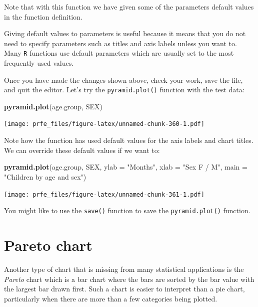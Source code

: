 \documentclass[12pt,]{book}
\newenvironment{Shaded}{\begin{snugshade}}{\end{snugshade}}
\newcommand{\KeywordTok}[1]{\textcolor[rgb]{0.13,0.29,0.53}{\textbf{#1}}}
\newcommand{\DataTypeTok}[1]{\textcolor[rgb]{0.13,0.29,0.53}{#1}}
\newcommand{\StringTok}[1]{\textcolor[rgb]{0.31,0.60,0.02}{#1}}
\newcommand{\NormalTok}[1]{#1}
\theoremstyle{definition}
\theoremstyle{definition}
\theoremstyle{definition}
\theoremstyle{remark}
\begin{document}
Note that with this function we have given some of the parameters
default values in the function definition.

Giving default values to parameters is useful because it means that you
do not need to specify parameters such as titles and axis labels unless
you want to. Many \texttt{R} functions use default parameters which are
usually set to the most frequently used values.

Once you have made the changes shown above, check your work, save the
file, and quit the editor. Let's try the \texttt{pyramid.plot()}
function with the test data:

\begin{Shaded}
\begin{Highlighting}[]
\KeywordTok{pyramid.plot}\NormalTok{(age.group, SEX)}
\end{Highlighting}
\end{Shaded}

\texttt{[image: prfe\_files/figure-latex/unnamed-chunk-360-1.pdf]}

Note how the function has used default values for the axis labels and
chart titles. We can override these default values if we want to:

\begin{Shaded}
\begin{Highlighting}[]
\KeywordTok{pyramid.plot}\NormalTok{(age.group, SEX, }\DataTypeTok{ylab =} \StringTok{"Months"}\NormalTok{, }\DataTypeTok{xlab =} \StringTok{"Sex F / M"}\NormalTok{,}
             \DataTypeTok{main =} \StringTok{"Children by age and sex"}\NormalTok{)}
\end{Highlighting}
\end{Shaded}

\texttt{[image: prfe\_files/figure-latex/unnamed-chunk-361-1.pdf]}

You might like to use the \texttt{save()} function to save the
\texttt{pyramid.plot()} function.

\hypertarget{pareto-chart}{%
\section{Pareto chart}\label{pareto-chart}}

Another type of chart that is missing from many statistical applications
is the \emph{Pareto} chart which is a bar chart where the bars are
sorted by the bar value with the largest bar drawn first. Such a chart
is easier to interpret than a pie chart, particularly when there are
more than a few categories being plotted.
\end{document}
